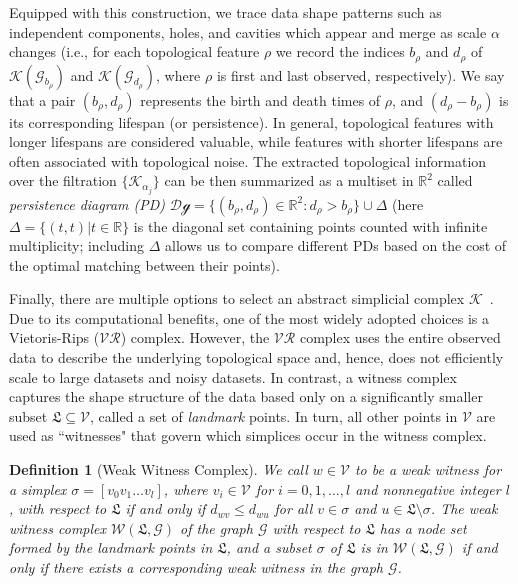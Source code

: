 \documentclass[letterpaper]{article} %
\newtheorem{definition}{Definition} %
\begin{document}
Equipped with this construction, we trace data shape patterns such as independent components, holes, and cavities which appear and merge as scale $\alpha$ changes (i.e., for each topological feature $\rho$ we record the indices $b_{\rho}$ and $d_{\rho}$ of $\mathscr{K}(\mathcal{G}_{b_{\rho}})$ and $\mathscr{K}(\mathcal{G}_{d_{\rho}})$, where $\rho$ is first and last observed, respectively). We say that
a pair $(b_{\rho}, d_{\rho})$ represents the birth and death times of $\rho$, and $(d_{\rho} - b_{\rho})$ is its corresponding lifespan (or persistence). In general, topological features with longer lifespans are considered valuable, while features with shorter lifespans are often associated with topological noise. The extracted topological information over the filtration $\{\mathscr{K}_{\alpha_j}\}$ can be then summarized as a multiset in $\mathbb{R}^2$ called {\it persistence diagram (PD)}
$\mathcal{\text{Dg}}=\{(b_{\rho},d_{\rho}) \in \mathbb{R}^2: d_{\rho} > b_{\rho}\}\cup \Delta$ (here $\Delta= \{(t, t) | t \in \mathbb{R}\}$ is the diagonal set containing points counted with infinite multiplicity; including $\Delta$ allows us to compare different PDs based on the cost of the optimal matching between their points).

Finally, there are multiple options to select an abstract simplicial complex $\mathscr{K}$~\cite{carlsson2021topological}. Due to its computational benefits, one of the most widely adopted choices is a Vietoris-Rips ($\mathcal{VR}$) complex.
However, the $\mathcal{VR}$ complex uses the entire observed data to describe the underlying topological space and, hence, does not efficiently scale to large datasets and noisy datasets. In contrast, a witness complex captures the shape structure of the data based only on a significantly smaller subset $\mathfrak{L}\subseteq \mathcal{V}$, called a set of {\it landmark} points. In turn, all other points in $\mathcal{V}$ are used as ``witnesses" that govern which simplices occur in the witness complex.
\begin{definition}[\footnotesize{Weak Witness Complex}]
\label{def2}
We call $w\in \mathcal{V}$ to be a {\it weak witness} for a simplex $\sigma=[v_0 v_1 \ldots v_l]$, where $v_i\in \mathcal{V}$ for $i=0,1,\ldots, l$ and nonnegative integer $l$, with respect to $\mathfrak{L}$ if and only if $d_{wv} \leq d_{wu}$ for all $v\in \sigma$ and $u \in  \mathfrak{L} \setminus \sigma$. The {\it weak witness complex} $\mathcal{W}(\mathfrak{L}, \mathcal{G})$ of the graph $\mathcal{G}$ with respect to $\mathfrak{L}$ has a node set formed by the landmark points in $\mathfrak{L}$, and a subset $\sigma$ of $\mathfrak{L}$ is in $\mathcal{W}(\mathfrak{L}, \mathcal{G})$ if and only if there exists a corresponding weak witness in the graph $\mathcal{G}$.
\end{definition}
\end{document}
